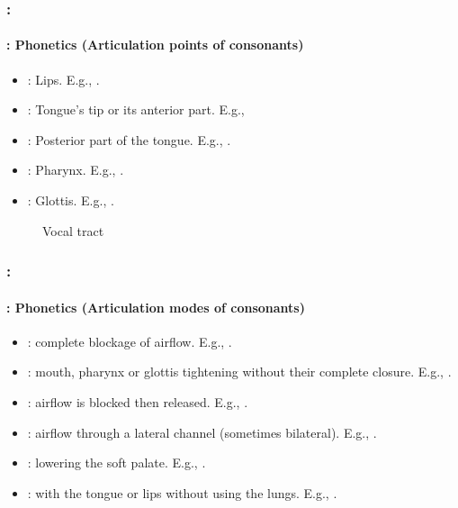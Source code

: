 \documentclass[xcolor=table]{beamer}
\begin{document}
\begin{frame}
	\frametitle{\insertshortsubtitle: \insertsection}
	\framesubtitle{\insertsubsection: Phonetics (Articulation points of consonants)}

	\begin{minipage}{0.55\textwidth}
	\begin{itemize}
		\item {}: Lips. E.g., \expword{\textipa{[b], [p], [m], [f], [v]}}.
		\item {}: Tongue's tip or its anterior part. 
		E.g., 
		\item {}: Posterior part of the tongue. E.g., .
		\item {}: Pharynx. 
		E.g., .
		\item {}: Glottis. 
		E.g., .
	\end{itemize}
	\end{minipage}
	\begin{minipage}{0.43\textwidth}
		\begin{figure}
			\caption{Vocal tract \cite{2009-ball}}
		\end{figure}
	\end{minipage}

\end{frame}

\begin{frame}
	\frametitle{\insertshortsubtitle: \insertsection}
	\framesubtitle{\insertsubsection: Phonetics (Articulation modes of consonants)}

	\begin{itemize}
		\item {}: complete blockage of airflow.
		E.g., \expword{\textipa{[p], [k], [b], [m], [n]}}.
		
		\item {}: mouth, pharynx or glottis tightening without their complete closure.
		E.g., \expword{\textipa{[f], [v], [s]}}.
		
		\item {}: airflow is blocked then released.
		E.g., \expword{\textipa{[\t{\textteshlig}]}}.
		
		\item {}: airflow through a lateral channel (sometimes bilateral).
		E.g., \expword{\textipa{[l]}}.
		
		\item {}: lowering the soft palate.
		E.g., \expword{\textipa{[m], [n]}}.
		
		\item {}: with the tongue or lips without using the lungs.
		E.g., .
		
	\end{itemize}

\end{frame}
\end{document}
